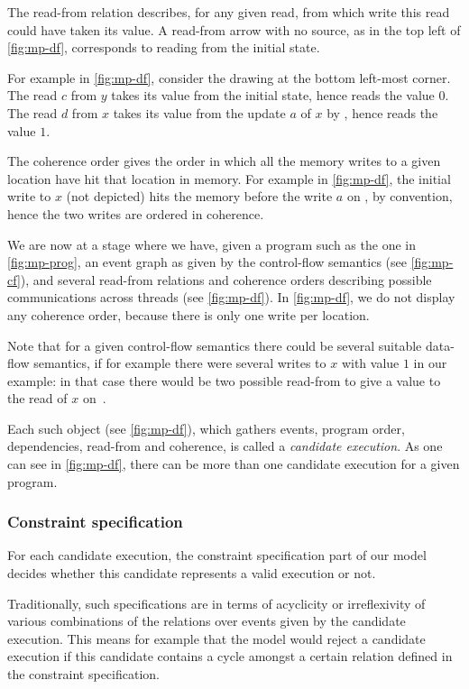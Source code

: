 \documentclass[a4paper]{article}
\begin{document}
The read-from relation \rf{} describes, for any given read, from which write
this read could have taken its value. A read-from arrow with no source, as in
the top left of \myfig\ref{fig:mp-df}, corresponds to reading from the initial
state.

For example in \myfig\ref{fig:mp-df}, consider the drawing at the bottom
left-most corner. The read $c$ from $y$ takes its value from the initial state,
hence reads the value $0$. The read $d$ from $x$ takes its value from the
update $a$ of $x$ by , hence reads the value $1$.

The coherence order gives the order in which all the memory writes to a given
location have hit that location in memory. For example in
\myfig\ref{fig:mp-df}, the initial write to $x$ (not depicted) hits the memory
before the write $a$ on , by convention, hence the two writes are
ordered in coherence.

We are now at a stage where we have, given a program such as the one in
\myfig\ref{fig:mp-prog}, an event graph as given by the control-flow semantics
(see \myfig\ref{fig:mp-cf}), and several read-from relations and coherence
orders describing possible communications across threads (see
\myfig\ref{fig:mp-df}). In \myfig\ref{fig:mp-df}, we do not display any
coherence order, because there is only one write per location.

Note that for a given control-flow semantics there could be several suitable
data-flow semantics, if for example there were several writes to $x$ with value
$1$ in our example: in that case there would be two possible read-from to give
a value to the read of $x$ on~.

Each such object (see \myfig\ref{fig:mp-df}), which gathers events, program
order, dependencies, read-from and coherence, is called a \emph{candidate
execution}.  As one can see in \myfig\ref{fig:mp-df}, there can be more than
one candidate execution for a given program.

\subsubsection{Constraint specification} For each candidate execution, the
constraint specification part of our model decides whether this candidate
represents a valid execution or not.

Traditionally, such specifications are in terms of acyclicity or irreflexivity
of various combinations of the relations over events given by the candidate
execution. This means for example that the model would reject a candidate
execution if this candidate contains a cycle amongst a certain relation defined
in the constraint specification.
\end{document}
